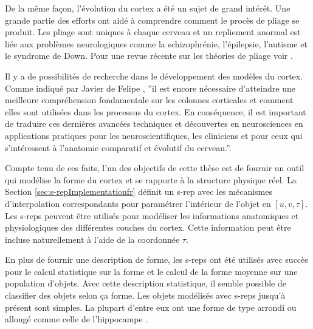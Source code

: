 De la même façon, l'évolution du cortex a été un sujet de grand intérêt.
Une grande partie des efforts ont aidé à comprendre comment le procès de pliage se produit.
Les pliage sont uniques à chaque cerveau et un repliement anormal est liée aux
problèmes neurologiques comme la schizophrénie, l'épilepsie, l'autisme et le syndrome de Down.
Pour une revue récente sur les théories de pliage voir \cite{filas2013mechanisms}.

Il y a de possibilités de recherche dans le développement des modèles du cortex.
Comme indiqué par Javier de Felipe \cite{defelipe2012neocortical}, ''il est encore nécessaire
d'atteindre une meilleure compréhension fondamentale sur les colonnes corticales
et comment elles sont utilisées dans les processus du cortex. En conséquence, il
est important de traduire ces dernières avancées techniques et
découvertes en neurosciences en applications pratiques pour
les neuroscientifiques, les cliniciens et pour ceux qui s'intéressent à l'anatomie 
comparatif et évolutif du cerveau.''.

Compte tenu de ces faits, l'un des objectifs de cette thèse est de fournir un
outil qui modélise la forme du cortex et se rapporte à la structure physique réel.
La Section \ref{sec:s-repImplementationfr} définit un s-rep
avec les mécanismes d'interpolation correspondants pour paramétrer l'intérieur de l'objet en $[u, v, \tau]$.
Les s-reps peuvent être utilisés pour modéliser les informations anatomiques et physiologiques des différentes couches du cortex.
Cette information peut être incluse naturellement à l'aide de la coordonnée $\tau$.

En plus de fournir une description de forme, les s-reps ont été utilisés avec succès pour le calcul
statistique sur la forme et le calcul de la forme moyenne sur une population d'objets.
Avec cette description statistique, il semble possible de classifier des objets selon ça forme.
Les objets modélisés avec s-reps jusqu'à présent sont simples. La plupart d'entre eux ont une
forme de type arrondi ou allongé comme celle de l'hippocampe \cite{pizer_nested_2012}.

